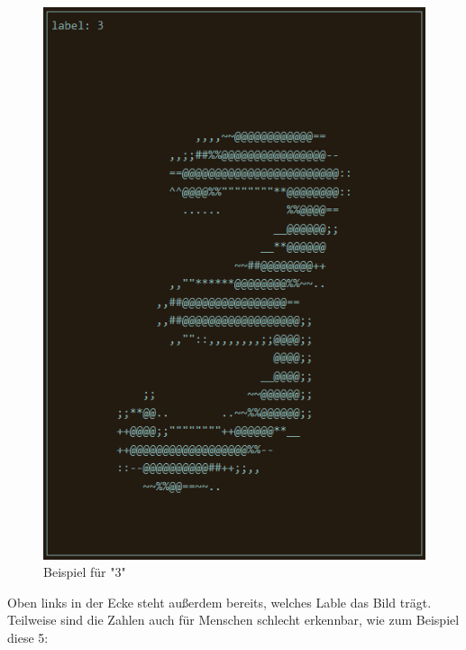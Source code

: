 \documentclass[12pt]{article}
\begin{document}
\begin{figure}[H]
\centering
\includegraphics[scale=0.60]{./Images/Pasted image 20231001133125.png}
\caption{Beispiel für "3"}
\label{Beispiel für "3"}
\end{figure}
Oben links in der Ecke steht außerdem bereits, welches Lable das Bild trägt. Teilweise sind die Zahlen auch für Menschen schlecht erkennbar, wie zum Beispiel diese 5:
\end{document}
